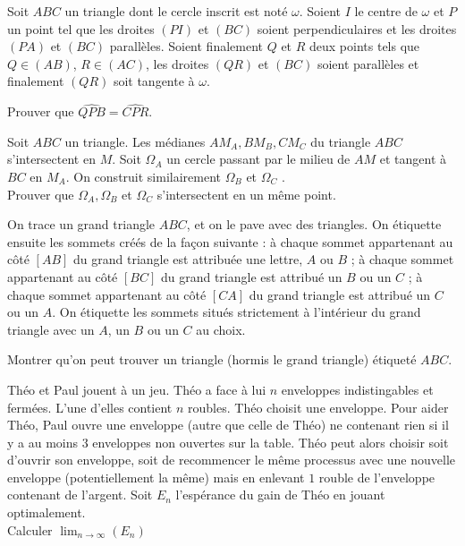 \begin{exo}{}
Soit $ABC$ un triangle dont le cercle inscrit est noté $ \omega$. Soient $I$ le centre  de $ \omega$ et $P$ un point tel que les droites $(PI)$ et $(BC)$ soient perpendiculaires et les droites $(PA)$ et $(BC)$ parallèles. Soient finalement $Q$ et $R$ deux points tels que $Q \in (AB)$, $R \in (AC)$, les droites $(QR)$ et $(BC)$ soient parallèles et finalement $(QR)$ soit tangente à $ \omega$.

Prouver que $ \widehat {QPB}= \widehat {CPR}$.
\end{exo}

\begin{exo}{}
Soit $ABC$ un triangle. Les médianes $AM_A,BM_B,CM_C$  du triangle $ABC$ s'intersectent en $M$. Soit  $\Omega_A$ un cercle passant par le milieu de $AM$ et tangent à $BC$ en $M_A$. On construit similairement  $\Omega_B$ et $\Omega_C$ . \\Prouver que $\Omega_A,\Omega_B$ et $\Omega_C$ s'intersectent en un même point.

\end{exo}


\begin{exo}{}
On trace un grand triangle $ABC$, et on le pave avec des triangles. On
étiquette ensuite les sommets créés de la façon suivante : à chaque
sommet appartenant au côté $[AB]$ du grand triangle est attribuée
une lettre, $A$ ou $B$ ; à chaque sommet appartenant au côté $[BC]$
du grand triangle est attribué un $B$ ou un $C$ ; à chaque sommet
appartenant au côté $[CA]$ du grand triangle est attribué un $C$ ou un $A$.
On étiquette les sommets situés strictement à l'intérieur du grand triangle
avec un $A$, un $B$ ou un $C$ au choix.

Montrer qu'on peut trouver un triangle (hormis le grand triangle) étiqueté $ABC$.
 \end{exo}


\begin{exo}{}
Théo et Paul jouent à un jeu. Théo a face à lui $n$ enveloppes indistingables et fermées. L'une d'elles contient $n$ roubles. Théo choisit une enveloppe. Pour aider Théo, Paul ouvre une enveloppe (autre que celle de Théo) ne contenant rien si il y a au moins $3$ enveloppes non ouvertes sur la table. Théo peut alors choisir soit d'ouvrir son enveloppe, soit de recommencer le même processus avec une nouvelle enveloppe (potentiellement la même) mais en enlevant $1$ rouble de l'enveloppe contenant de l'argent. Soit $E_n$ l'espérance du gain de Théo en jouant optimalement. \\
Calculer $\lim_{n\to \infty}(E_n)$
\end{exo}

